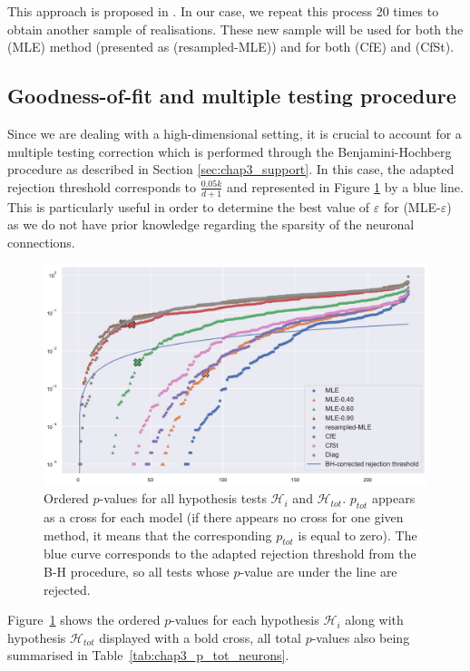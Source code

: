 This approach is proposed in \textcite[Section 3.4]{Reynaud2014}. In our case, we repeat this process 20 times to obtain another sample of realisations. These new sample will be used for both the (MLE) method (presented as (resampled-MLE)) and for both (CfE) and (CfSt).


\subsection{Goodness-of-fit and multiple testing procedure}

Since we are dealing with a high-dimensional setting, it is crucial to account for a multiple testing correction which is performed through the Benjamini-Hochberg procedure as described in Section \ref{sec:chap3_support}. In this case, the adapted rejection threshold corresponds to $\frac{0.05 k}{d+1}$ and represented in Figure \ref{fig:chap3_p_values_neurons} by a blue line.
This is particularly useful in order to determine the best value of $\varepsilon$ for (MLE-$\varepsilon$) as we do not have prior knowledge regarding the sparsity of the neuronal connections.

{\begin{figure}[!ht]
\centering
\includegraphics[width=0.9\linewidth]{images/chapter3/p_values_conf.pdf}
\caption{Ordered $p$-values for all hypothesis tests $\mathcal{H}_i$ and $\mathcal{H}_{tot}$. $p_{tot}$ appears as a cross for each model (if there appears no cross for one given method, it means that the corresponding $p_{tot}$ is equal to zero). The blue curve corresponds to the adapted rejection threshold from the B-H procedure, so all tests whose $p$-value are under the line are rejected.}
\label{fig:chap3_p_values_neurons}
\end{figure}}

 Figure~\ref{fig:chap3_p_values_neurons} shows the ordered $p$-values for each hypothesis $\mathcal{H}_i$ along with hypothesis $\mathcal{H}_{tot}$ displayed with a bold cross, all total $p$-values also being summarised in Table~\ref{tab:chap3_p_tot_neurons}. 
    
